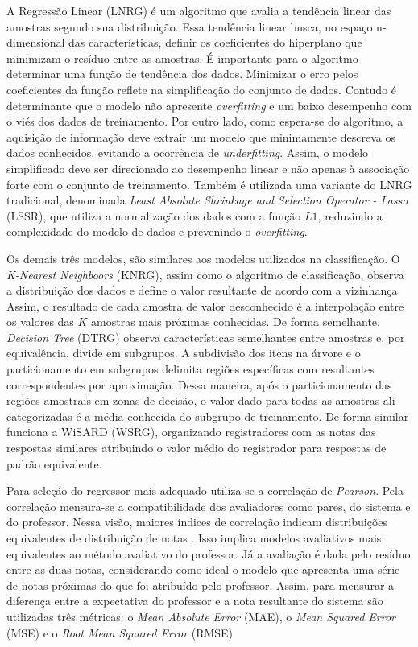 A Regressão Linear (LNRG) é um algoritmo que avalia a tendência linear das amostras segundo sua distribuição. Essa tendência linear busca, no espaço n-dimensional das características, definir os coeficientes do hiperplano que minimizam o resíduo entre as amostras. É importante para o algoritmo determinar uma função de tendência dos dados. Minimizar o erro pelos coeficientes da função reflete na simplificação do conjunto de dados. Contudo é determinante que o modelo não apresente \textit{overfitting} e um baixo desempenho com o viés dos dados de treinamento. Por outro lado, como espera-se do algoritmo, a aquisição de informação deve extrair um modelo que minimamente descreva os dados conhecidos, evitando a ocorrência de \textit{underfitting}. Assim, o modelo simplificado deve ser direcionado ao desempenho linear e não apenas à associação forte com o conjunto de treinamento. Também é utilizada uma variante do LNRG tradicional, denominada \textit{Least Absolute Shrinkage and Selection Operator - Lasso} (LSSR), que utiliza a normalização dos dados com a função $ L1 $, reduzindo a complexidade do modelo de dados e prevenindo o \textit{overfitting}.

Os demais três modelos, são similares aos modelos utilizados na classificação. O \textit{K-Nearest Neighboors} (KNRG), assim como o algoritmo de classificação, observa a distribuição dos dados e define o valor resultante de acordo com a vizinhança. Assim, o resultado de cada amostra de valor desconhecido é a interpolação entre os valores das $ K $ amostras mais próximas conhecidas. De forma semelhante, \textit{Decision Tree} (DTRG) observa características semelhantes entre amostras e, por equivalência, divide em subgrupos. A subdivisão dos itens na árvore e o particionamento em subgrupos delimita regiões específicas com resultantes correspondentes por aproximação. Dessa maneira, após o particionamento das regiões amostrais em zonas de decisão, o valor dado para todas as amostras ali categorizadas é a média conhecida do subgrupo de treinamento. De forma similar funciona a WiSARD (WSRG), organizando registradores com as notas das respostas similares atribuindo o valor médio do registrador para respostas de padrão equivalente.

Para seleção do regressor mais adequado utiliza-se a correlação de \textit{Pearson}. Pela correlação mensura-se a compatibilidade dos avaliadores como pares, do sistema e do professor. Nessa visão, maiores índices de correlação indicam distribuições equivalentes de distribuição de notas \cite{morettin2010}. Isso implica modelos avaliativos mais equivalentes ao método avaliativo do professor. Já a avaliação é dada pelo resíduo entre as duas notas, considerando como ideal o modelo que apresenta uma série de notas próximas do que foi atribuído pelo professor. Assim, para mensurar a diferença entre a expectativa do professor e a nota resultante do sistema são utilizadas três métricas: o \textit{Mean Absolute Error} (MAE), o \textit{Mean Squared Error} (MSE) e o \textit{Root Mean Squared Error} (RMSE)

